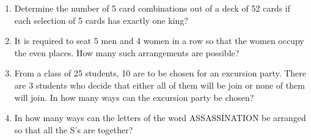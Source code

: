 \begin{enumerate}[label=\arabic*.,ref=\thesubsection.\theenumi]
\item Determine the number of 5 card combinations out of a deck of 52 cards if each selection of 5 cards has exactly one king?\\

\item It is required to seat 5 men and 4 women in a row so that the women occupy the even places. How many such arrangements are possible?\\

\item From a class of 25 students, 10 are to be chosen for an excursion party. There are 3 students who decide that either all of them will be join or none of them will join. In how many ways can the excursion party be chosen?\\

\item In how many ways can the letters of the word ASSASSINATION be arranged so that all the S's are together?\end{enumerate}
%
    
